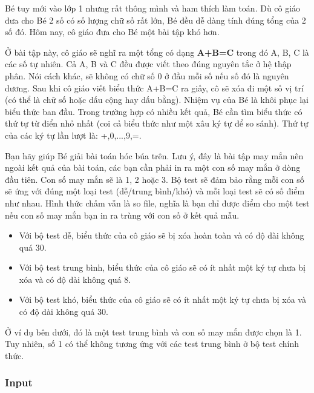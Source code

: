 



   Bé tuy mới vào lớp 1 nhưng rất thông mình và ham thích làm toán. Dù cô giáo đưa cho Bé 2 số có số lượng chữ số rất lớn, Bé đều dễ dàng tính đúng tổng của 2 số đó. Hôm nay, cô giáo đưa cho Bé một bài tập khó hơn.  

   Ở bài tập này, cô giáo sẽ nghĩ ra một tổng có dạng   \textbf{    A+B=C   }   trong đó A, B, C là các số tự nhiên. Cả A, B và C đều được viết theo đúng nguyên tắc ở hệ thập phân. Nói cách khác, sẽ không có chữ số 0 ở đầu mỗi số nếu số đó là nguyên dương. Sau khi cô giáo viết biểu thức A+B=C ra giấy, cô sẽ xóa đi một số vị trí (có thể là chữ số hoặc dấu cộng hay dấu bằng). Nhiệm vụ của Bé là khôi phục lại biểu thức ban đầu. Trong trường hợp có nhiều kết quả, Bé cần tìm biểu thức có thứ tự từ điển nhỏ nhất (coi cả biểu thức như một xâu ký tự để so sánh). Thứ tự của các ký tự lần lượt là: +,0,...,9,=.  

   Bạn hãy giúp Bé giải bài toán hóc búa trên. Lưu ý, đây là bài tập may mắn nên ngoài kết quả của bài toán, các bạn cần phải in ra một con số may mắn ở dòng đầu tiên. Con số may mắn sẽ là 1, 2 hoặc 3. Bộ test sẽ đảm bảo rằng mỗi con số sẽ ứng với đúng một loại test (dễ/trung bình/khó) và mỗi loại test sẽ có số điểm như nhau. Hình thức chấm vẫn là so file, nghĩa là bạn chỉ được điểm cho một test nếu con số may mắn bạn in ra trùng với con số ở kết quả mẫu.  
\begin{itemize}
	\item     Với bộ test dễ, biểu thức của cô giáo sẽ bị xóa hoàn toàn và có độ dài không quá 30.   
\end{itemize}
\begin{itemize}
	\item     Với bộ test trung bình, biểu thức của cô giáo sẽ có ít nhất một ký tự chưa bị xóa và có độ dài không quá 8.   
\end{itemize}
\begin{itemize}
	\item     Với bộ test khó, biểu thức của cô giáo sẽ có ít nhất một ký tự chưa bị xóa và có độ dài không quá 30.   
\end{itemize}

   Ở ví dụ bên dưới, đó là một test trung bình và con số may mắn được chọn  là 1. Tuy nhiên, số 1 có thể không tương ứng với các test trung bình ở  bộ test chính thức.  

\subsubsection{   Input  }


